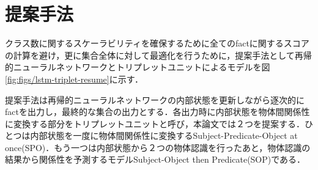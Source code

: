 \section{提案手法}
クラス数に関するスケーラビリティを確保するために全てのfactに関するスコアの計算を避け，更に集合全体に対して最適化を行うために，提案手法として再帰的ニューラルネットワークとトリプレットユニットによるモデルを図\ref{fig:figs/lstm-triplet-resume}に示す．

提案手法は再帰的ニューラルネットワークの内部状態を更新しながら逐次的にfactを出力し，最終的な集合の出力とする．各出力時に内部状態を物体間関係性に変換する部分をトリプレットユニットと呼び，本論文では２つを提案する．ひとつは内部状態を一度に物体間関係性に変換するSubject-Predicate-Object at once(SPO)．もう一つは内部状態から２つの物体認識を行ったあと，物体認識の結果から関係性を予測するモデルSubject-Object then Predicate(SOP)である．

